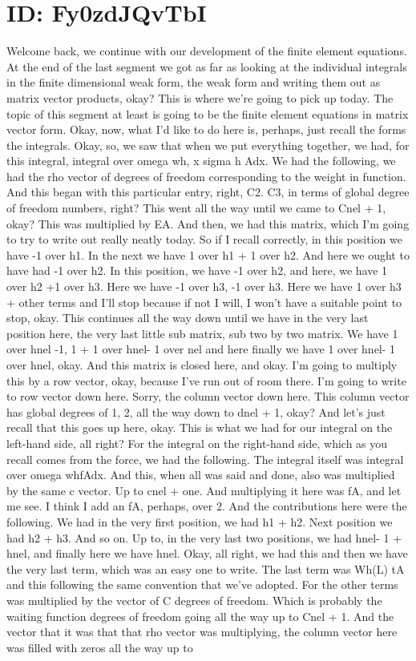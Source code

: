 \documentclass[10pt]{article}
\begin{document}
\section*{ID: Fy0zdJQvTbI}
Welcome back, we continue with our development of the finite element equations. At the end of the last segment we got as far as looking at the individual integrals in the finite dimensional weak form, the weak form and writing them out as matrix vector products, okay? This is where we're going to pick up today. The topic of this segment at least is going to be the finite element equations in matrix vector form. Okay, now, what I'd like to do here is, perhaps, just recall the forms the integrals. Okay, so, we saw that when we put everything together, we had, for this integral, integral over omega wh, x sigma h Adx. We had the following, we had the rho vector of degrees of freedom corresponding to the weight in function. And this began with this particular entry, right, C2. C3, in terms of global degree of freedom numbers, right? This went all the way until we came to Cnel + 1, okay? This was multiplied by EA. And then, we had this matrix, which I'm going to try to write out really neatly today. So if I recall correctly, in this position we have -1 over h1. In the next we have 1 over h1 + 1 over h2. And here we ought to have had -1 over h2. In this position, we have -1 over h2, and here, we have 1 over h2 +1 over h3. Here we have -1 over h3, -1 over h3. Here we have 1 over h3 + other terms and I'll stop because if not I will, I won't have a suitable point to stop, okay. This continues all the way down until we have in the very last position here, the very last little sub matrix, sub two by two matrix. We have 1 over hnel -1, 1 + 1 over hnel- 1 over nel and here finally we have 1 over hnel- 1 over hnel, okay. And this matrix is closed here, and okay. I'm going to multiply this by a row vector, okay, because I've run out of room there. I'm going to write to row vector down here. Sorry, the column vector down here. This column vector has global degrees of 1, 2, all the way down to dnel + 1, okay? And let's just recall that this goes up here, okay. This is what we had for our integral on the left-hand side, all right? For the integral on the right-hand side, which as you recall comes from the force, we had the following. The integral itself was integral over omega whfAdx. And this, when all was said and done, also was multiplied by the same c vector. Up to cnel + one. And multiplying it here was fA, and let me see. I think I add an fA, perhaps, over 2. And the contributions here were the following. We had in the very first position, we had h1 + h2. Next position we had h2 + h3. And so on. Up to, in the very last two positions, we had hnel- 1 + hnel, and finally here we have hnel. Okay, all right, we had this and then we have the very last term, which was an easy one to write. The last term was Wh(L) tA and this following the same convention that we've adopted. For the other terms was multiplied by the vector of C degrees of freedom. Which is probably the waiting function degrees of freedom going all the way up to Cnel + 1. And the vector that it was that that rho vector was multiplying, the column vector here was filled with zeros all the way up to 
\end{document}

